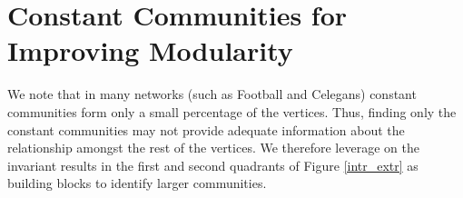 \begin{center}
\begin{algorithm}[!ht]
\begin{algorithmic}[]
      \EndIf
    \EndFor


\EndProcedure

  
   
   \hfill {} 
\EndFor
{}
\EndProcedure

\end{algorithmic}
\end{algorithm}
\end{center}


\section{Constant Communities for Improving Modularity}\label{sec:improve}
 We note that in many networks (such as Football and Celegans) constant communities form only a small percentage of the vertices. Thus,
finding only the constant communities may not provide adequate information about the relationship amongst the rest of the vertices. We
therefore leverage on the invariant results in the first and second quadrants of 
Figure \ref{intr_extr} as building blocks to identify larger communities.






